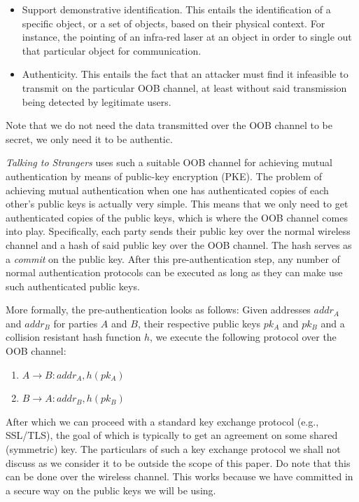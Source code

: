 \documentclass[conference, 11pt]{sty/IEEEtran}
\newlength{\arrow}
\begin{document}
\begin{itemize}
    \item Support demonstrative identification.
        This entails the identification of a specific object, or a set of objects, based on their physical context.
        For instance, the pointing of an infra-red laser at an object in order to single out that particular object for communication.
    \item Authenticity.
        This entails the fact that an attacker must find it infeasible to transmit on the particular OOB channel, at least without said transmission being detected by legitimate users.
\end{itemize}

Note that we do not need the data transmitted over the OOB channel to be secret, we only need it to be authentic.

\emph{Talking to Strangers} uses such a suitable OOB channel for achieving mutual authentication by means of public-key encryption (PKE).
The problem of achieving mutual authentication when one has authenticated copies of each other's public keys is actually very simple.
This means that we only need to get authenticated copies of the public keys, which is where the OOB channel comes into play.
Specifically, each party sends their public key over the normal wireless channel and a hash of said public key over the OOB channel.
The hash serves as a \emph{commit} on the public key.
After this pre-authentication step, any number of normal authentication protocols can be executed as long as they can make use such authenticated public keys.

More formally, the pre-authentication looks as follows:
Given addresses $addr_A$ and $addr_B$ for parties $A$ and $B$, their respective public keys $pk_A$ and $pk_B$ and a collision resistant hash function $h$, we execute the following protocol over the OOB channel:

\begin{enumerate}
    \item $A \rightarrow B: addr_A, h(pk_A)$
    \item $B \rightarrow A: addr_B, h(pk_B)$
\end{enumerate}

After which we can proceed with a standard key exchange protocol (e.g., SSL/TLS), the goal of which is typically to get an agreement on some shared (symmetric) key.
The particulars of such a key exchange protocol we shall not discuss as we consider it to be outside the scope of this paper.
Do note that this can be done over the wireless channel.
This works because we have committed in a secure way on the public keys we will be using.
\end{document}
